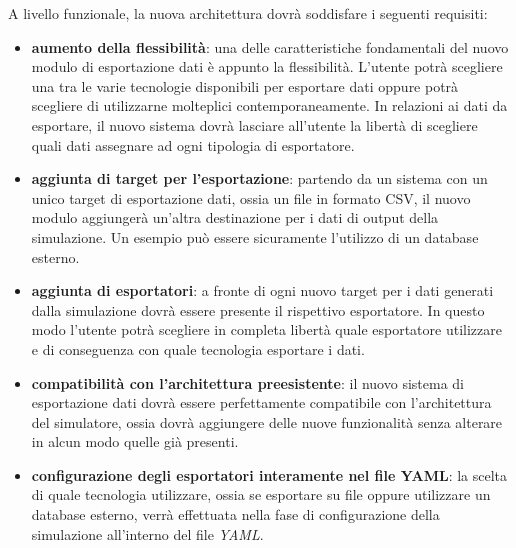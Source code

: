 \documentclass[12pt,a4paper,openright,oneside]{book}
\begin{document}
A livello funzionale, la nuova architettura dovrà soddisfare i seguenti requisiti:
\begin{itemize}
    \item \textbf{aumento della flessibilità}: una delle caratteristiche fondamentali del nuovo modulo di esportazione dati è appunto la flessibilità. L'utente potrà scegliere una tra le varie tecnologie disponibili per esportare dati oppure potrà scegliere di utilizzarne molteplici contemporaneamente.
    In relazioni ai dati da esportare, il nuovo sistema dovrà lasciare all'utente la libertà di scegliere quali dati assegnare ad ogni tipologia di esportatore.
    \item \textbf{aggiunta di target per l'esportazione}: partendo da un sistema con un unico target di esportazione dati, ossia un file in formato CSV, il nuovo modulo aggiungerà un'altra destinazione per i dati di output della simulazione. Un esempio può essere sicuramente l'utilizzo di un database esterno.
    \item \textbf{aggiunta di esportatori}: a fronte di ogni nuovo target per i dati generati dalla simulazione dovrà essere presente il rispettivo esportatore. In questo modo l'utente potrà scegliere in completa libertà  quale esportatore utilizzare e di conseguenza con quale tecnologia esportare i dati.
    \item \textbf{compatibilità con l'architettura preesistente}: il nuovo sistema di esportazione dati dovrà essere perfettamente compatibile con l'architettura del simulatore, ossia dovrà aggiungere delle nuove funzionalità senza alterare in alcun modo quelle già presenti.
    \item \textbf{configurazione degli esportatori interamente nel file YAML}: la scelta di quale tecnologia utilizzare, ossia se esportare su file oppure utilizzare un database esterno, verrà effettuata nella fase di configurazione della simulazione all'interno del file \textit{YAML}. 
\end{itemize}
\end{document}
